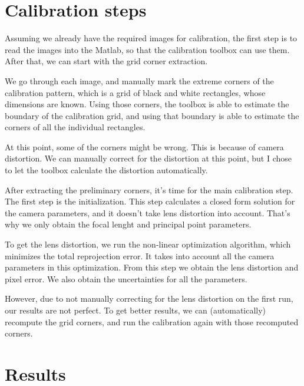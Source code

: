 

\section{Calibration steps}

Assuming we already have the required images for calibration, the first step is
to read the images into the Matlab, so that the calibration toolbox can use
them. After that, we can start with the grid corner extraction.

We go through each image, and manually mark the extreme corners of the
calibration pattern, which is a grid of black and white rectangles, whose
dimensions are known. Using those corners, the toolbox is able to estimate the
boundary of the calibration grid, and using that boundary is able to estimate
the corners of all the individual rectangles.

At this point, some of the corners might be wrong. This is because of camera
distortion. We can manually correct for the distortion at this point, but I
chose to let the toolbox calculate the distortion automatically.

After extracting the preliminary corners, it's time for the main calibration
step. The first step is the initialization. This step calculates a closed form
solution for the camera parameters, and it doesn't take lens distortion into
account. That's why we only obtain the focal lenght and principal point
parameters.

To get the lens distortion, we run the non-linear optimization algorithm, which
minimizes the total reprojection error. It takes into account all the camera
parameters in this optimization. From this step we obtain the lens distortion
and pixel error. We also obtain the uncertainties for all the parameters.

However, due to not manually correcting for the lens distortion on the first
run, our results are not perfect. To get better results, we can (automatically)
recompute the grid corners, and run the calibration again with those recomputed
corners.



\section{Results}

